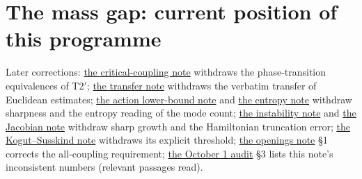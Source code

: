 \documentclass[11pt,a4paper]{article}
\begin{document}
\hypertarget{the-mass-gap-current-position-of-this-programme}{%
\section{The mass gap: current position of this
programme}\label{the-mass-gap-current-position-of-this-programme}}

Later corrections: \href{mass-gap-obligations-lattice.md}{the
critical-coupling note} withdraws the phase-transition equivalences of
T2\('\); \href{ground-state-measure-transfer.md}{the transfer note}
withdraws the verbatim transfer of Euclidean estimates;
\href{large-field-action-lower-bound.md}{the action lower-bound note}
and \href{large-field-entropy-count.md}{the entropy note} withdraw
sharpness and the entropy reading of the mode count;
\href{flow-instability-large-field.md}{the instability note} and
\href{flow-jacobian-truncation-error.md}{the Jacobian note} withdraw
sharp growth and the Hamiltonian truncation error;
\href{kogut-susskind-strong-coupling-explicit.md}{the Kogut--Susskind
note} withdraws its explicit threshold; \href{mass-gap-openings.md}{the
openings note} §1 corrects the all-coupling requirement;
\href{corpus-audit-2026-10-01.md}{the October 1 audit} §3 lists this
note's inconsistent numbers (relevant passages read).
\end{document}
